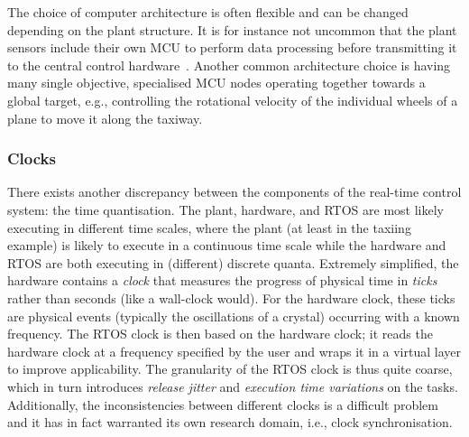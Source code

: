 The choice of computer architecture is often flexible and can be changed depending on the plant structure.
It is for instance not uncommon that the plant sensors include their own MCU to perform data processing before transmitting it to the central control hardware~\cite{Karray:2018}.
Another common architecture choice is having many single objective, specialised MCU nodes operating together towards a global target, e.g., controlling the rotational velocity of the individual wheels of a plane to move it along the taxiway.

\subsubsection{Clocks}%
%
There exists another discrepancy between the components of the real-time control system: the time quantisation.
The plant, hardware, and RTOS are most likely executing in different time scales, where the plant (at least in the taxiing example) is likely to execute in a continuous time scale while the hardware and RTOS are both executing in (different) discrete quanta.
Extremely simplified, the hardware contains a \emph{clock} that measures the progress of physical time in \emph{ticks} rather than seconds (like a wall-clock would).
For the hardware clock, these ticks are physical events (typically the oscillations of a crystal) occurring with a known frequency.
The RTOS clock is then based on the hardware clock; it reads the hardware clock at a frequency specified by the user and wraps it in a virtual layer to improve applicability. 
The granularity of the RTOS clock is thus quite coarse, which in turn introduces \emph{release jitter} and \emph{execution time variations} on the tasks.
Additionally, the inconsistencies between different clocks is a difficult problem and it has in fact warranted its own research domain, i.e., clock synchronisation.


